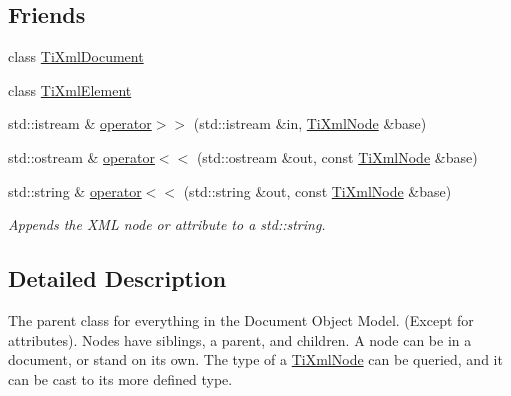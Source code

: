 \subsection*{Friends}
\begin{DoxyCompactItemize}
\item 
\hypertarget{class_ti_xml_node_a173617f6dfe902cf484ce5552b950475}{
class \hyperlink{class_ti_xml_node_a173617f6dfe902cf484ce5552b950475}{TiXmlDocument}}
\label{class_ti_xml_node_a173617f6dfe902cf484ce5552b950475}

\item 
\hypertarget{class_ti_xml_node_ab6592e32cb9132be517cc12a70564c4b}{
class \hyperlink{class_ti_xml_node_ab6592e32cb9132be517cc12a70564c4b}{TiXmlElement}}
\label{class_ti_xml_node_ab6592e32cb9132be517cc12a70564c4b}

\item 
std::istream \& \hyperlink{class_ti_xml_node_ab57bd426563c926844f65a78412e18b9}{operator$>$$>$} (std::istream \&in, \hyperlink{class_ti_xml_node}{TiXmlNode} \&base)
\item 
std::ostream \& \hyperlink{class_ti_xml_node_a86cd49cfb17a844c0010b3136ac966c7}{operator$<$$<$} (std::ostream \&out, const \hyperlink{class_ti_xml_node}{TiXmlNode} \&base)
\item 
\hypertarget{class_ti_xml_node_a52ef17e7080df2490cf87bde380685ab}{
std::string \& \hyperlink{class_ti_xml_node_a52ef17e7080df2490cf87bde380685ab}{operator$<$$<$} (std::string \&out, const \hyperlink{class_ti_xml_node}{TiXmlNode} \&base)}
\label{class_ti_xml_node_a52ef17e7080df2490cf87bde380685ab}

\begin{DoxyCompactList}\small\item\em Appends the XML node or attribute to a std::string. \item\end{DoxyCompactList}\end{DoxyCompactItemize}


\subsection{Detailed Description}
The parent class for everything in the Document Object Model. (Except for attributes). Nodes have siblings, a parent, and children. A node can be in a document, or stand on its own. The type of a \hyperlink{class_ti_xml_node}{TiXmlNode} can be queried, and it can be cast to its more defined type. 

